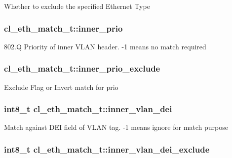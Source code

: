 Whether to exclude the specified Ethernet Type \hypertarget{structcl__eth__match__t_af8ba880b8b5c93e090977755b2bb39de}{
\subsubsection[{inner\-\_\-prio}]{ cl\-\_\-eth\-\_\-match\-\_\-t\-::inner\-\_\-prio}}\label{structcl__eth__match__t_af8ba880b8b5c93e090977755b2bb39de}
802.\-Q Priority of inner V\-L\-A\-N header. -\/1 means no match required \hypertarget{structcl__eth__match__t_ae8b56ca5dc1129b254498de569086f00}{
\subsubsection[{inner\-\_\-prio\-\_\-exclude}]{ cl\-\_\-eth\-\_\-match\-\_\-t\-::inner\-\_\-prio\-\_\-exclude}}\label{structcl__eth__match__t_ae8b56ca5dc1129b254498de569086f00}
Exclude Flag or Invert match for prio \hypertarget{structcl__eth__match__t_a2dc088ea60a83a9842881c6f7700eb76}{
\subsubsection[{inner\-\_\-vlan\-\_\-dei}]{\setlength{\rightskip}{0pt plus 5cm}int8\-\_\-t cl\-\_\-eth\-\_\-match\-\_\-t\-::inner\-\_\-vlan\-\_\-dei}}\label{structcl__eth__match__t_a2dc088ea60a83a9842881c6f7700eb76}
Match against D\-E\-I field of V\-L\-A\-N tag. -\/1 means ignore for match purpose \hypertarget{structcl__eth__match__t_ae6eb57d9d1bf6ac87e020af2ba603be0}{
\subsubsection[{inner\-\_\-vlan\-\_\-dei\-\_\-exclude}]{\setlength{\rightskip}{0pt plus 5cm}int8\-\_\-t cl\-\_\-eth\-\_\-match\-\_\-t\-::inner\-\_\-vlan\-\_\-dei\-\_\-exclude}}\label{structcl__eth__match__t_ae6eb57d9d1bf6ac87e020af2ba603be0}

